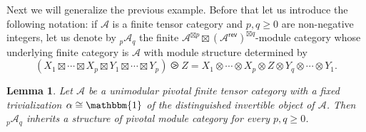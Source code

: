 \documentclass[11pt]{article}
\newtheorem{lemma}[theorem]{Lemma}
\theoremstyle{definition}
\begin{document}
Next we will generalize the previous example. Before that let us introduce the following notation: if $\mathcal{A}$ is a finite tensor category and $p,q \geq 0$ are non-negative integers, let us denote by  ${}_p \mathcal{A}_q$ the finite $\mathcal{A}^{\boxtimes p}\boxtimes \left( \mathcal{A}^{\mathsf{rev}} \right)^{\boxtimes q}$-module category whose underlying finite category is $\mathcal{A}$ with module structure determined by $$(X_1 \boxtimes \cdots \boxtimes X_p \boxtimes Y_1 \boxtimes \cdots \boxtimes Y_p) \ogreaterthan Z=  X_1 \otimes \cdots \otimes  X_p \otimes Z \otimes Y_q \otimes \cdots \otimes Y_1.  $$

\begin{lemma}\label{lem:disk_FH}
Let $\mathcal{A}$ be  a unimodular pivotal finite tensor category with a  fixed trivialization $\alpha \cong \mathbbm{1}$ of the distinguished invertible object of $\mathcal{A}$. Then ${}_p \mathcal{A}_q$ inherits a structure of pivotal module category for every $p,q \geq 0$.
\end{lemma}
\end{document}

